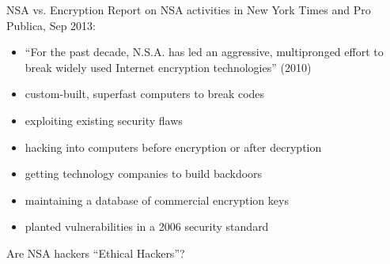 \documentclass{beamer}
\begin{document}
\begin{frame}{NSA vs. Encryption}
Report on NSA activities in New York Times and Pro Publica, Sep 2013:
\begin{itemize}
\item ``For the past decade, N.S.A. has led an aggressive, multipronged effort to break widely used Internet encryption technologies'' (2010)
\item custom-built, superfast computers to break codes
\item exploiting existing security flaws
\item hacking into computers before encryption or after decryption
\item getting technology companies to build backdoors
\item maintaining a database of commercial encryption keys
\item planted vulnerabilities in a 2006 security standard
\end{itemize}
\bigskip
Are NSA hackers ``Ethical Hackers''?
\end{frame}
\end{document}
